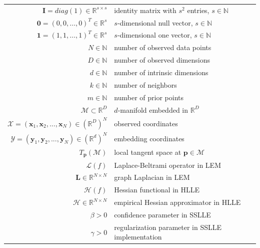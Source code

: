 \documentclass[12pt, t]{article}
\newcommand{\mani}{\mathcal{M}}
\newcommand{\N}{\mathbb{N}}
\newcommand{\R}{\mathbb{R}}
\newcommand{\RD}{\mathbb{R}^D}
\newcommand{\Rd}{\mathbb{R}^d}
\newcommand{\X}{\mathcal{X}}
\newcommand{\x}{\bm{x}}
\newcommand{\Y}{\mathcal{Y}}
\newcommand{\pv}{\bm{p}}
\newcommand{\I}{\bm{I}}
\newcommand{\Lap}{\bm{L}}
\begin{document}
\begin{tabular}{rl}
  $\I = \mathit{diag}(1) \in \R^{s \times s}$ & identity matrix with $s^2$ 
  entries, $s \in \N$ \\
  $\bm{0} = (0, 0, \dots, 0)^T \in \R^s$ & $s$-dimensional null vector, 
  $s \in \N$ \\
  $\bm{1} = (1, 1, \dots, 1)^T \in \R^s$ & $s$-dimensional one vector, 
  $s \in \N$ \\
  $N \in \N$ & number of observed data points \\
  $D \in \N$ & number of observed dimensions \\
  $d \in \N$ & number of intrinsic dimensions\\
  $k \in \N$ & number of neighbors \\
  $m \in \N$ & number of prior points \\
  $\mani \subset \RD$ & $d$-manifold embedded in $\RD$ \\
  $\X = (\bm{x}_1, \bm{x}_2, ..., \bm{x}_N) \in (\RD)^N$ & observed
  coordinates \\
  $\Y = (\bm{y}_1, \bm{y}_2, ..., \bm{y}_N) \in (\Rd)^N$ & embedding
  coordinates \\
  $T_{\pv}(\mani)$ & local tangent space at $\pv \in \mani$ \\
  $\mathcal{L}(f)$ & Laplace-Beltrami operator in LEM \\
  $\Lap\in \R^{N \times N}$ & graph Laplacian in LEM \\
  $\mathscr{H}(f)$ & Hessian functional in HLLE \\
  $\mathcal{H} \in \R^{N \times N}$ & empirical Hessian approximator in HLLE \\
  $\beta > 0$ & confidence parameter in SSLLE \\
  $\gamma > 0$ & regularization parameter in SSLLE implementation
\end{tabular}

\newpage

\listoffigures
\newpage


    
\end{document}
